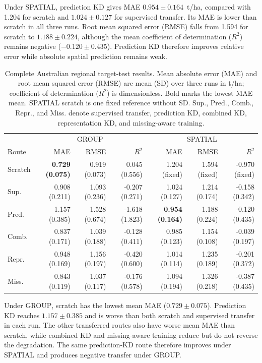 \documentclass[runningheads]{venue/lncs/llncs}
\newcommand{\group}{\textsc{GROUP}}
\newcommand{\spatial}{\textsc{SPATIAL}}
\begin{document}
Under \spatial{}, prediction KD gives MAE $0.954\pm0.164$~t/ha, compared with 1.204 for scratch and $1.024\pm0.127$ for supervised transfer. Its MAE is lower than scratch in all three runs. Root mean squared error (RMSE) falls from 1.594 for scratch to $1.188\pm0.224$, although the mean coefficient of determination ($R^2$) remains negative ($-0.120\pm0.435$). Prediction KD therefore improves relative error while absolute spatial prediction remains weak.

\begin{table}[t]
\centering
\scriptsize
\caption{Complete Australian regional target-test results. Mean absolute error (MAE) and root mean squared error (RMSE) are mean (SD) over three runs in t/ha; coefficient of determination ($R^2$) is dimensionless. Bold marks the lowest MAE mean. SPATIAL scratch is one fixed reference without SD. Sup., Pred., Comb., Repr., and Miss. denote supervised transfer, prediction KD, combined KD, representation KD, and missing-aware training.}
\label{tab:performance}
\setlength{\tabcolsep}{1.3pt}
\begin{tabular}{@{}lrrrrrr@{}}
\toprule
 & \multicolumn{3}{c}{GROUP} & \multicolumn{3}{c}{SPATIAL}\\
Route & MAE & RMSE & $R^2$ & MAE & RMSE & $R^2$\\
\midrule
Scratch & \textbf{0.729 (0.075)} & 0.919 (0.073) & 0.045 (0.556) & 1.204 (fixed) & 1.594 (fixed) & -0.970 (fixed)\\
Sup. & 0.908 (0.211) & 1.093 (0.236) & -0.207 (0.271) & 1.024 (0.127) & 1.214 (0.174) & -0.158 (0.342)\\
Pred. & 1.157 (0.385) & 1.528 (0.674) & -1.618 (1.823) & \textbf{0.954 (0.164)} & 1.188 (0.224) & -0.120 (0.435)\\
Comb. & 0.837 (0.171) & 1.039 (0.188) & -0.128 (0.411) & 0.985 (0.123) & 1.154 (0.108) & -0.039 (0.197)\\
Repr. & 0.948 (0.169) & 1.156 (0.197) & -0.420 (0.600) & 1.014 (0.114) & 1.235 (0.189) & -0.201 (0.372)\\
Miss. & 0.843 (0.119) & 1.037 (0.117) & -0.176 (0.578) & 1.094 (0.194) & 1.326 (0.218) & -0.387 (0.435)\\
\bottomrule
\end{tabular}
\end{table}

Under \group{}, scratch has the lowest mean MAE ($0.729\pm0.075$). Prediction KD reaches $1.157\pm0.385$ and is worse than both scratch and supervised transfer in each run. The other transferred routes also have worse mean MAE than scratch, while combined KD and missing-aware training reduce but do not reverse the degradation. The same prediction-KD route therefore improves under SPATIAL and produces negative transfer under GROUP.
\end{document}
